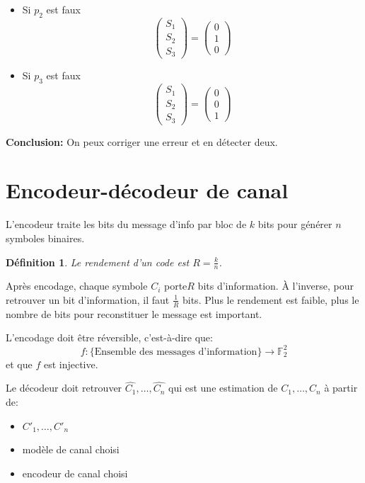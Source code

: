 \documentclass[a4paper,10pt,twocolumn]{article}
\theoremstyle{break}
\newcommand{\F}{\mathbb{F}}
\newcommand{\FF}{\F_2}
\newcommand{\FFn}[1]{\FF^{#1}}
\newtheorem{mydef}{Définition}
\begin{document}
\begin{itemize}
 \item Si $p_2$ est faux
 $$ \left(\begin{array}{c}
 S_1\\
 S_2\\
 S_3
\end{array}\right) =
 \left(\begin{array}{c}
 0\\
 1\\
 0
\end{array}\right) $$
 \item Si $p_3$ est faux
 $$ \left(\begin{array}{c}
 S_1\\
 S_2\\
 S_3
\end{array}\right) =
 \left(\begin{array}{c}
 0\\
 0\\
 1
\end{array}\right) $$

\end{itemize}

\textbf{Conclusion:} On peux corriger une erreur et en détecter deux.

\section{Encodeur-décodeur de canal}
L'encodeur traite les bits du message d'info par bloc de $k$ bits pour générer $n$ symboles binaires.

\begin{mydef}
 Le rendement d'un code est $ R = \frac{k}{n} $.
\end{mydef}

Après encodage, chaque symbole $C_i$ \flqq porte\frqq $R$ bits d'information. 
À l'inverse, pour retrouver un bit d'information, il faut $\frac{1}{R}$ bits.
Plus le rendement est faible, plus le nombre de bits pour reconstituer le message est important.

L'encodage doit être réversible, c'est-à-dire que:
$$ f: \{\text{Ensemble des messages d'information}\} \rightarrow \FFn{2} $$
et que $f$ est injective.

Le décodeur doit retrouver $\hat{C_1}, \ldots, \hat{C_n}$ qui est une estimation de $C_1, \ldots, C_n$ à partir de:
\begin{itemize}
 \item $C'_1, \ldots, C'_n$
 \item modèle de canal choisi
 \item encodeur de canal choisi
\end{itemize}
\end{document}
